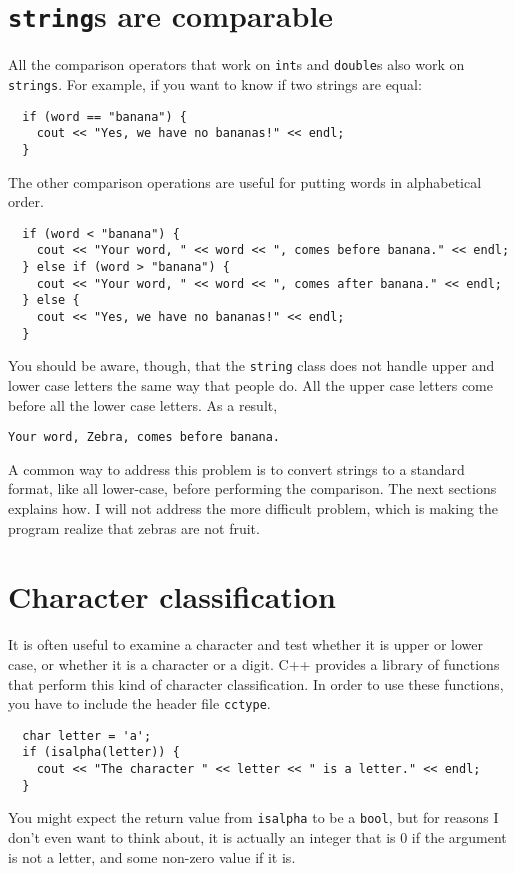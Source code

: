 \section{{\tt string}s are comparable}
\label{incomparable}

All the comparison operators that work on {\tt int}s and
{\tt double}s also work on {\tt strings}.  For example,
if you want to know if two strings are equal:

\begin{verbatim}
  if (word == "banana") {
    cout << "Yes, we have no bananas!" << endl;
  }
\end{verbatim}
%
The other comparison operations are useful for putting words
in alphabetical order.

\begin{verbatim}
  if (word < "banana") {
    cout << "Your word, " << word << ", comes before banana." << endl;
  } else if (word > "banana") {
    cout << "Your word, " << word << ", comes after banana." << endl;
  } else {
    cout << "Yes, we have no bananas!" << endl;
  }
\end{verbatim}
%
You should be aware, though, that the {\tt string} class does
not handle upper and lower case letters the same way that people
do.  All the upper case letters come before all the lower case
letters.  As a result,

\begin{verbatim}
Your word, Zebra, comes before banana.
\end{verbatim}
%
A common way to address this problem is to convert strings to a
standard format, like all lower-case, before performing the
comparison.  The next sections explains how.  I will not address the
more difficult problem, which is making the program realize that
zebras are not fruit.

\section{Character classification}

It is often useful to examine a character and test whether
it is upper or lower case, or whether it is a character or
a digit.  C++ provides a library of functions that perform
this kind of character classification.  In order to use these
functions, you have to include the header file {\tt cctype}.

\begin{verbatim}
  char letter = 'a';
  if (isalpha(letter)) {
    cout << "The character " << letter << " is a letter." << endl;
  }
\end{verbatim}
%
You might expect the return value from {\tt isalpha} to
be a {\tt bool}, but for reasons I don't even want to think
about, it is actually an integer that is
0 if the argument is not a letter, and some non-zero value
if it is.


